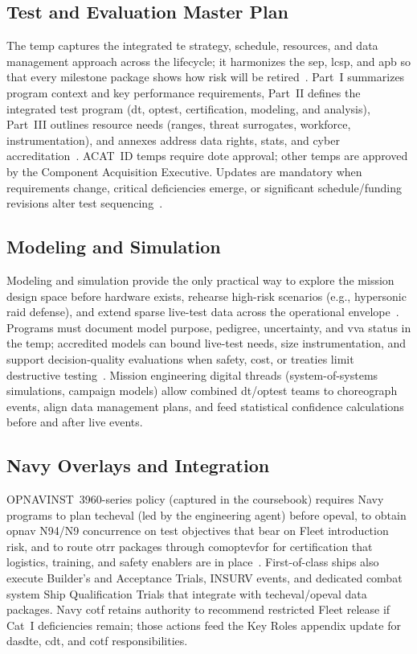 \documentclass[../main.tex]{subfiles}
\begin{document}
\subsection{Test and Evaluation Master Plan}
The \ac{temp} captures the integrated \ac{te} strategy, schedule, resources, and data management approach across the lifecycle; it harmonizes the \ac{sep}, \ac{lcsp}, and \ac{apb} so that every milestone package shows how risk will be retired~\autocite{DoDAcqGuidebook}. Part~I summarizes program context and key performance requirements, Part~II defines the integrated test program (\ac{dt}, \ac{optest}, certification, modeling, and analysis), Part~III outlines resource needs (ranges, threat surrogates, workforce, instrumentation), and annexes address data rights, stats, and cyber accreditation~\autocite{DoDI5000-89}. ACAT~ID \acp{temp} require \ac{dote} approval; other \acp{temp} are approved by the Component Acquisition Executive. Updates are mandatory when requirements change, critical deficiencies emerge, or significant schedule/funding revisions alter test sequencing~\autocite{DoDI5000-85}.

\subsection{Modeling and Simulation}
Modeling and simulation provide the only practical way to explore the mission design space before hardware exists, rehearse high-risk scenarios (e.g., hypersonic raid defense), and extend sparse live-test data across the operational envelope~\autocite{edo-3-5-5-test-eval-part-i-2025}. Programs must document model purpose, pedigree, uncertainty, and \ac{vva} status in the \ac{temp}; accredited models can bound live-test needs, size instrumentation, and support decision-quality evaluations when safety, cost, or treaties limit destructive testing~\autocite{DoDI5000-89}. Mission engineering digital threads (system-of-systems simulations, campaign models) allow combined \ac{dt}/\ac{optest} teams to choreograph events, align data management plans, and feed statistical confidence calculations before and after live events.

\subsection{Navy Overlays and Integration}
OPNAVINST~3960-series policy (captured in the coursebook) requires Navy programs to plan \ac{techeval} (led by the engineering agent) before \ac{opeval}, to obtain \ac{opnav} N94/N9 concurrence on test objectives that bear on Fleet introduction risk, and to route \ac{otrr} packages through \ac{comoptevfor} for certification that logistics, training, and safety enablers are in place~\autocite{edo-3-5-6-test-eval-part-ii-2025}. First-of-class ships also execute Builder's and Acceptance Trials, INSURV events, and dedicated combat system Ship Qualification Trials that integrate with \ac{techeval}/\ac{opeval} data packages. Navy \ac{cotf} retains authority to recommend restricted Fleet release if Cat~I deficiencies remain; those actions feed the Key Roles appendix update for \ac{dasdte}, \ac{cdt}, and \ac{cotf} responsibilities.
\end{document}
